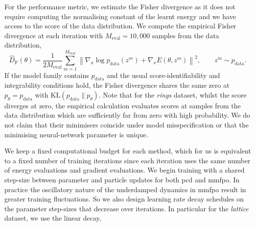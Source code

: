 For the performance metric, we estimate the Fisher divergence as it does not require computing the normalising constant of the learnt energy and we have access to the score of the data distribution. We compute the empirical Fisher divergence at each iteration with $M_{\mathrm{eval}}=10,000$ samples from the data distribution,
\begin{equation*}
    \widehat D_{\mathrm F}(\theta)
    =\frac1{2M_{\mathrm{eval}}}
    \sum_{m=1}^{M_{\mathrm{eval}}}
    \left\|
    \nabla_x\log p_{\mathrm{data}}(z^m)
    +\nabla_xE(\theta,z^m)
    \right\|^2,
    \qquad
    z^m\sim p_{\mathrm{data}}.
\end{equation*}
If the model family contains $p_{\mathrm{data}}$ and the usual score-identifiability and integrability conditions hold, the Fisher divergence shares the same zero at $p_\theta=p_{\mathrm{data}}$ with $\mathrm{KL}(p_{\mathrm{data}}\|p_\theta)$. Note that for the \textit{rings} dataset, whilst the score diverges at zero, the empirical calculation evaluates scores at samples from the data distribution which are sufficiently far from zero with high probability. We do not claim that their minimisers coincide under model misspecification or that the minimising neural-network parameter is unique.

We keep a fixed computational budget for each method, which for us is equivalent to a fixed number of training iterations since each iteration uses the same number of energy evaluations and gradient evaluations. We begin training with a shared step-size between parameter and particle updates for both \gls*{pcd} and \gls*{mmfpo}. In practice the oscillatory nature of the underdamped dynamics in \gls*{mmfpo} result in greater training fluctuations. So we also design learning rate decay schedules on the parameter step-sizes that decrease over iterations. In particular for the \textit{lattice} dataset, we use the linear decay,

